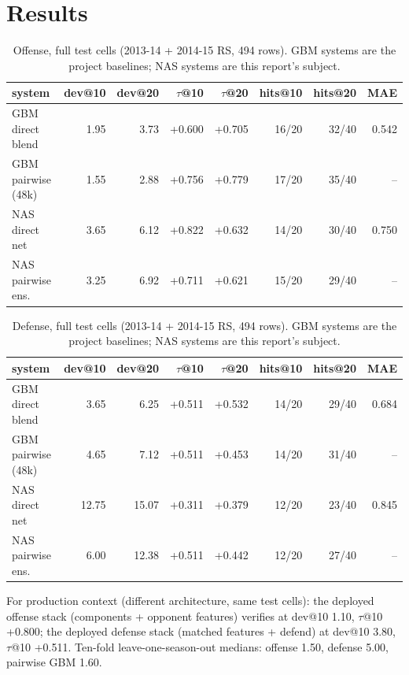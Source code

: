 \documentclass[10pt]{article}
\begin{document}
\section{Results}
\begin{table}[ht]\centering\small
\caption{Offense, full test cells (2013-14 + 2014-15 RS, 494 rows). GBM systems are the project baselines; NAS systems are this report's subject.}\label{tab:full-offense}
\begin{tabular}{lrrrrrrr}
\toprule
system & dev@10 & dev@20 & $\tau$@10 & $\tau$@20 & hits@10 & hits@20 & MAE \\
\midrule
GBM direct blend & 1.95 & 3.73 & +0.600 & +0.705 & 16/20 & 32/40 & 0.542 \\
GBM pairwise (48k) & 1.55 & 2.88 & +0.756 & +0.779 & 17/20 & 35/40 & -- \\
NAS direct net & 3.65 & 6.12 & +0.822 & +0.632 & 14/20 & 30/40 & 0.750 \\
NAS pairwise ens. & 3.25 & 6.92 & +0.711 & +0.621 & 15/20 & 29/40 & -- \\
\bottomrule
\end{tabular}
\end{table}
\begin{table}[ht]\centering\small
\caption{Defense, full test cells (2013-14 + 2014-15 RS, 494 rows). GBM systems are the project baselines; NAS systems are this report's subject.}\label{tab:full-defense}
\begin{tabular}{lrrrrrrr}
\toprule
system & dev@10 & dev@20 & $\tau$@10 & $\tau$@20 & hits@10 & hits@20 & MAE \\
\midrule
GBM direct blend & 3.65 & 6.25 & +0.511 & +0.532 & 14/20 & 29/40 & 0.684 \\
GBM pairwise (48k) & 4.65 & 7.12 & +0.511 & +0.453 & 14/20 & 31/40 & -- \\
NAS direct net & 12.75 & 15.07 & +0.311 & +0.379 & 12/20 & 23/40 & 0.845 \\
NAS pairwise ens. & 6.00 & 12.38 & +0.511 & +0.442 & 12/20 & 27/40 & -- \\
\bottomrule
\end{tabular}
\end{table}
For production context (different architecture, same test cells): the deployed offense stack (components + opponent features) verifies at dev@10 1.10, $\tau$@10 +0.800; the deployed defense stack (matched features + defend) at dev@10 3.80, $\tau$@10 +0.511. Ten-fold leave-one-season-out medians: offense 1.50, defense 5.00, pairwise GBM 1.60.
\end{document}
